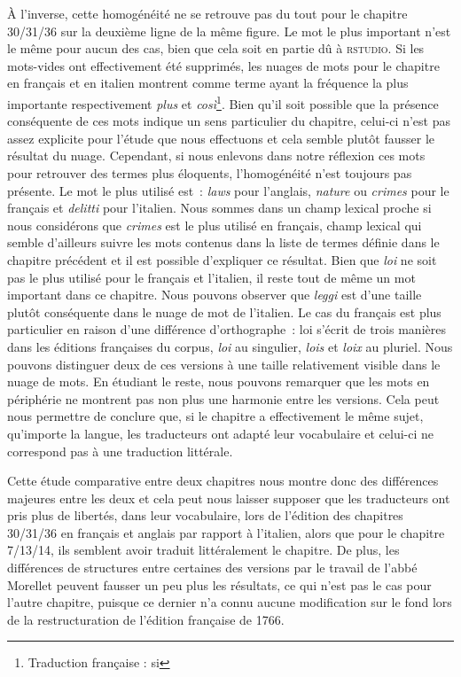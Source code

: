 À l'inverse, cette homogénéité ne se retrouve pas du tout pour le chapitre 30/31/36 sur la deuxième ligne de la même figure. Le mot le plus important n'est le même pour aucun des cas, bien que cela soit en partie dû à \textsc{rstudio}. Si les mots-vides ont effectivement été supprimés, les nuages de mots pour le chapitre en français et en italien montrent comme terme ayant la fréquence la plus importante respectivement \textit{plus} et \textit{così}\footnote{Traduction française : si}. Bien qu'il soit possible que la présence conséquente de ces mots indique un sens particulier du chapitre, celui-ci n'est pas assez explicite pour l'étude que nous effectuons et cela semble plutôt fausser le résultat du nuage. Cependant, si nous enlevons dans notre réflexion ces mots pour retrouver des termes plus éloquents, l'homogénéité n'est toujours pas présente. Le mot le plus utilisé est~: \textit{laws} pour l'anglais, \textit{nature} ou \textit{crimes} pour le français et \textit{delitti} pour l'italien. Nous sommes dans un champ lexical proche si nous considérons que \textit{crimes} est le plus utilisé en français, champ lexical qui semble d'ailleurs suivre les mots contenus dans la liste de termes définie dans le chapitre précédent et il est possible d'expliquer ce résultat. Bien que \textit{loi} ne soit pas le plus utilisé pour le français et l'italien, il reste tout de même un mot important dans ce chapitre. Nous pouvons observer que \textit{leggi} est d'une taille plutôt conséquente dans le nuage de mot de l'italien. Le cas du français est plus particulier en raison d'une différence d'orthographe~: loi s'écrit de trois manières dans les éditions françaises du corpus, \textit{loi} au singulier, \textit{lois} et \textit{loix} au pluriel. Nous pouvons distinguer deux de ces versions à une taille relativement visible dans le nuage de mots. En étudiant le reste, nous pouvons remarquer que les mots en périphérie ne montrent pas non plus une harmonie entre les versions. Cela peut nous permettre de conclure que, si le chapitre a effectivement le même sujet, qu'importe la langue, les traducteurs ont adapté leur vocabulaire et celui-ci ne correspond pas à une traduction littérale. 

Cette étude comparative entre deux chapitres nous montre donc des différences majeures entre les deux et cela peut nous laisser supposer que les traducteurs ont pris plus de libertés, dans leur vocabulaire, lors de l'édition des chapitres 30/31/36 en français et anglais par rapport à l'italien, alors que pour le chapitre 7/13/14, ils semblent avoir traduit littéralement le chapitre. De plus, les différences de structures entre certaines des versions par le travail de l'abbé Morellet peuvent fausser un peu plus les résultats, ce qui n'est pas le cas pour l'autre chapitre, puisque ce dernier n'a connu aucune modification sur le fond lors de la restructuration de l'édition française de 1766.

